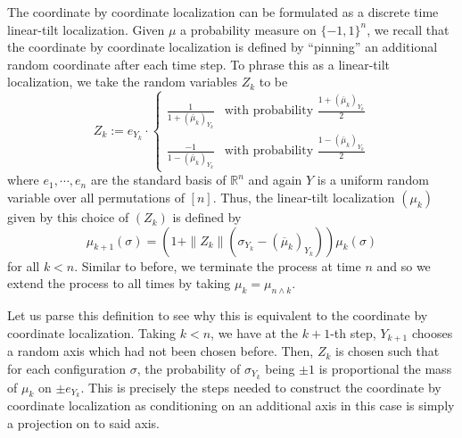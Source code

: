 The coordinate by coordinate localization can be formulated as a discrete time linear-tilt localization.
Given \(\mu\) a probability measure on \(\{-1, 1\}^n\), we recall that the coordinate by coordinate 
localization is defined by ``pinning'' an additional random coordinate after each time step. To phrase 
this as a linear-tilt localization, we take the random variables \(Z_k\) to be
\begin{equation}\label{eq:def_Z}
  Z_k := e_{Y_k} \cdot
    \begin{cases}
      \frac{1}{1 + (\bar{\mu}_k)_{Y_k}} & \text{with probability } \frac{1 + (\bar{\mu}_k)_{Y_k}}{2} \\
      \frac{-1}{1 - (\bar{\mu}_k)_{Y_k}} & \text{with probability } \frac{1 - (\bar{\mu}_k)_{Y_k}}{2}
    \end{cases}
\end{equation}
where \(e_1, \cdots, e_n\) are the standard basis of \(\mathbb{R}^n\) and again \(Y\) is a uniform 
random variable over all permutations of \([n]\). Thus, the linear-tilt localization \((\mu_k)\) given by this 
choice of \((Z_k)\) is defined by
\[\mu_{k + 1}(\sigma) = (1 + \|Z_k\|(\sigma_{Y_k} - (\overline{\mu}_k)_{Y_k}))\mu_k(\sigma)\]
for all \(k < n\). Similar to before, we terminate the process at time \(n\) and so we extend the process 
to all times by taking \(\mu_k = \mu_{n \wedge k}\).

Let us parse this definition to see why this is equivalent to the coordinate by coordinate localization. 
Taking \(k < n\), we have at the \(k + 1\)-th step, \(Y_{k + 1}\) chooses a random axis
which had not been chosen before. Then, \(Z_k\) is chosen such that for each configuration \(\sigma\), 
the probability of \(\sigma_{Y_k}\) being \(\pm 1\) is proportional the mass of \(\mu_k\) on \(\pm e_{Y_k}\). 
This is precisely the steps needed to construct the coordinate by coordinate localization as conditioning 
on an additional axis in this case is simply a projection on to said axis. 